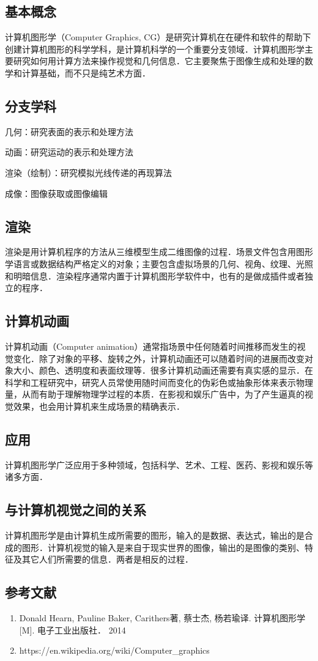 
\subsection{基本概念}
计算机图形学（Computer Graphics, CG）是研究计算机在在硬件和软件的帮助下创建计算机图形的科学学科，是计算机科学的一个重要分支领域．计算机图形学主要研究如何用计算方法来操作视觉和几何信息．它主要聚焦于图像生成和处理的数学和计算基础，而不只是纯艺术方面．

\subsection{分支学科}
几何：研究表面的表示和处理方法

动画：研究运动的表示和处理方法

渲染（绘制）：研究模拟光线传递的再现算法

成像：图像获取或图像编辑


\subsection{渲染}
渲染是用计算机程序的方法从三维模型生成二维图像的过程．场景文件包含用图形学语言或数据结构严格定义的对象；主要包含虚拟场景的几何、视角、纹理、光照和明暗信息．渲染程序通常内置于计算机图形学软件中，也有的是做成插件或者独立的程序．



\subsection{计算机动画}
计算机动画（Computer animation）通常指场景中任何随着时间推移而发生的视觉变化．除了对象的平移、旋转之外，计算机动画还可以随着时间的进展而改变对象大小、颜色、透明度和表面纹理等．很多计算机动画还需要有真实感的显示．在科学和工程研究中，研究人员常使用随时间而变化的伪彩色或抽象形体来表示物理量，从而有助于理解物理学过程的本质．在影视和娱乐广告中，为了产生逼真的视觉效果，也会用计算机来生成场景的精确表示．


\subsection{应用}
计算机图形学广泛应用于多种领域，包括科学、艺术、工程、医药、影视和娱乐等诸多方面．

\subsection{与计算机视觉之间的关系}
计算机图形学是由计算机生成所需要的图形，输入的是数据、表达式，输出的是合成的图形．计算机视觉的输入是来自于现实世界的图像，输出的是图像的类别、特征及其它人们所需要的信息．两者是相反的过程．


\subsection{参考文献}
\begin{enumerate}
\item Donald Hearn, Pauline Baker, Carithers著, 蔡士杰, 杨若瑜译. 计算机图形学[M]. 电子工业出版社． 2014
\item https://en.wikipedia.org/wiki/Computer_graphics
\end{enumerate}